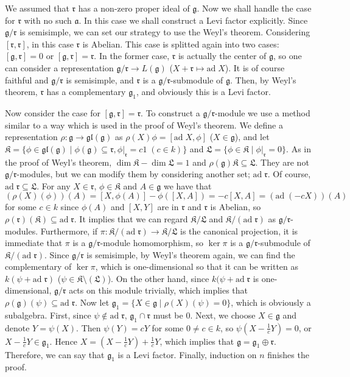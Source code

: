 \documentclass{article}
\newcommand{\SBar}{\;|\;}
\newcommand{\lie}[1]{\mathfrak{#1}}
\newcommand{\ad}[1]{\mathrm{ad}\; #1}
\begin{document}
We assumed that $\lie{r}$ has a non-zero proper ideal of $\lie{g}$.
Now we shall handle the case for $\lie{r}$ with no such $\lie{a}$.
In this case we shall construct a Levi factor explicitly.
Since $\lie{g}/\lie{r}$ is semisimple, we can set our strategy to use the Weyl's theorem.
Considering $[\lie{r}, \lie{r}]$, in this case $\lie{r}$ is Abelian.
This case is splitted again into two cases: $[\lie{g}, \lie{r}] = 0$ or $[\lie{g}, \lie{r}] = \lie{r}$.
In the former case, $\lie{r}$ is actually the center of $\lie{g}$, so one can consider a representation $\lie{g}/\lie{r} \to L(\lie{g})$ ($X + \lie{r} \mapsto \ad{X}$).
It is of course faithful and $\lie{g}/\lie{r}$ is semisimple, and $\lie{r}$ is a $\lie{g}/\lie{r}$-submodule of $\lie{g}$.
Then, by Weyl's theorem, $\lie{r}$ has a complementary $\lie{g}_1$, and obviously this is a Levi factor.

Now consider the case for $[\lie{g}, \lie{r}] = \lie{r}$.
To construct a $\lie{g}/\lie{r}$-module we use a method similar to a way which is used in the proof of Weyl's theorem.
We define a representation $\rho : \lie{g} \to \lie{gl}(\lie{g})$ as $\rho(X) \phi = [\ad{X}, \phi]$ ($X \in \lie{g}$), and let $\lie{K} = \{\phi \in \lie{gl}(\lie{g}) \SBar \phi(\lie{g}) \subseteq \lie{r}, \phi|_{\lie{r}} = c1 \; (c \in k)\}$ and $\lie{L} = \{\phi \in \lie{K} \SBar \phi|_\lie{r} = 0\}$.
As in the proof of Weyl's theorem, $\dim{\lie{K}} - \dim{\lie{L}} = 1$ and $\rho(\lie{g}) \lie{K} \subseteq \lie{L}$.
They are not $\lie{g}/\lie{r}$-modules, but we can modify them by considering another set; $\ad{\lie{r}}$.
Of course, $\ad{\lie{r}} \subseteq \lie{L}$.
For any $X \in \lie{r}$, $\phi \in \lie{K}$ and $A \in \lie{g}$ we have that $(\rho(X)(\phi))(A) = [X, \phi(A)] - \phi([X, A]) = -c[X, A] = (\ad{(-cX)})(A)$ for some $c \in k$ since $\phi(A)$ and $[X, Y]$ are in $\lie{r}$ and $\lie{r}$ is Abelian, so $\rho(\lie{r})(\lie{K}) \subseteq \ad{\lie{r}}$.
It implies that we can regard $\lie{K}/\lie{L}$ and $\lie{K}/(\ad{\lie{r}})$ as $\lie{g}/\lie{r}$-modules.
Furthermore, if $\pi : \lie{K}/(\ad{\lie{r}}) \to \lie{K}/\lie{L}$ is the canonical projection, it is immediate that $\pi$ is a $\lie{g}/\lie{r}$-module homomorphism, so $\ker{\pi}$ is a $\lie{g}/\lie{r}$-submodule of $\lie{K}/(\ad{\lie{r}})$.
Since $\lie{g}/\lie{r}$ is semisimple, by Weyl's theorem again, we can find the complementary of $\ker{\pi}$, which is one-dimensional so that it can be written as $k(\psi + \ad{\lie{r}})$ ($\psi \in \lie{K} \setminus (\lie{L})$).
On the other hand, since $k(\psi + \ad{\lie{r}}$ is one-dimensional, $\lie{g}/\lie{r}$ acts on this module trivially, which implies that $\rho(\lie{g})(\psi) \subseteq \ad{\lie{r}}$.
Now let $\lie{g}_1 = \{X \in \lie{g} \SBar \rho(X)(\psi) = 0\}$, which is obviously a subalgebra.
First, since $\psi \notin \ad{\lie{r}}$, $\lie{g}_1 \cap \lie{r}$ must be 0.
Next, we choose $X \in \lie{g}$ and denote $Y = \psi(X)$.
Then $\psi(Y) = cY$ for some $0 \ne c \in k$, so $\psi(X - \frac{1}{c} Y) = 0$, or $X - \frac{1}{c} Y \in \lie{g}_1$.
Hence $X = (X - \frac{1}{c} Y) + \frac{1}{c} Y$, which implies that $\lie{g} = \lie{g}_1 \oplus \lie{r}$.
Therefore, we can say that $\lie{g}_1$ is a Levi factor.
Finally, induction on $n$ finishes the proof.
\end{document}
